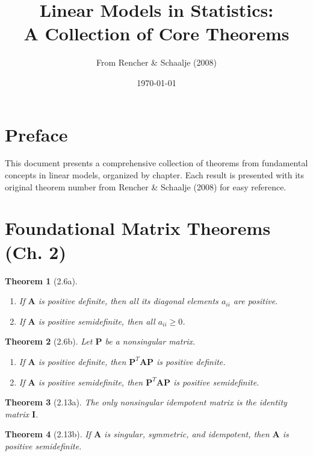 \documentclass{article}
\title{Linear Models in Statistics: \\[0.5em] A Collection of Core Theorems}
\author{From Rencher \& Schaalje (2008)}
\date{\today}
\newtheorem{theorem}{Theorem}[section]
\begin{document}
\maketitle

\tableofcontents

\section*{Preface}
This document presents a comprehensive collection of theorems from fundamental concepts in linear models, organized by chapter. Each result is presented with its original theorem number from Rencher \& Schaalje (2008) for easy reference.

\newpage

\section{Foundational Matrix Theorems (Ch. 2)}

\begin{theorem}[2.6a] 
\begin{enumerate}[label=(\roman*)]
\item If $\mathbf{A}$ is positive definite, then all its diagonal elements $a_{ii}$ are positive.
\item If $\mathbf{A}$ is positive semidefinite, then all $a_{ii} \geq 0$.
\end{enumerate}
\end{theorem}

\begin{theorem}[2.6b]
Let $\mathbf{P}$ be a nonsingular matrix.
\begin{enumerate}[label=(\roman*)]
\item If $\mathbf{A}$ is positive definite, then $\mathbf{P}^T\mathbf{A}\mathbf{P}$ is positive definite.
\item If $\mathbf{A}$ is positive semidefinite, then $\mathbf{P}^T\mathbf{A}\mathbf{P}$ is positive semidefinite.
\end{enumerate}
\end{theorem}

\begin{theorem}[2.13a]
The only nonsingular idempotent matrix is the identity matrix $\mathbf{I}$.
\end{theorem}

\begin{theorem}[2.13b]
If $\mathbf{A}$ is singular, symmetric, and idempotent, then $\mathbf{A}$ is positive semidefinite.
\end{theorem}
\end{document}
